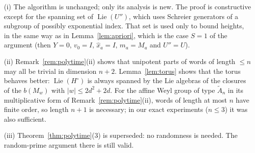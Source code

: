 \begin{remark}\label{rem:detpoly}
(i) The algorithm is unchanged; only its analysis is new. The proof is constructive except for the spanning set
of $\operatorname{Lie}(U'')$, which uses Schreier generators of a subgroup of possibly exponential index. That set is used
only to bound heights, in the same way as in Lemma~\ref{lem:apriori}, which is the case $S=1$ of the argument
(then $Y=0$, $v_0=I$, $\hat x_a=I$, $m_a=M_a$ and $U''=U$).

(ii) Remark~\ref{rem:polytime}(ii) shows that unipotent parts of words of length $\le n$ may all be trivial in
dimension $n+2$. Lemma~\ref{lem:torus} shows that the torus behaves better: $\operatorname{Lie}(H^\circ)$ is always spanned by
the Lie algebras of the closures of the $b(M_w)$ with $|w|\le2d^2+2d$. For the affine Weyl group of type
$\tilde A_n$ in its multiplicative form of Remark~\ref{rem:polytime}(ii), words of length at most $n$ have
finite order, so length $n+1$ is necessary; in our exact experiments ($n\le3$) it was also sufficient.

(iii) Theorem~\ref{thm:polytime}(3) is superseded: no randomness is needed. The random-prime argument there is
still valid.
\end{remark}
